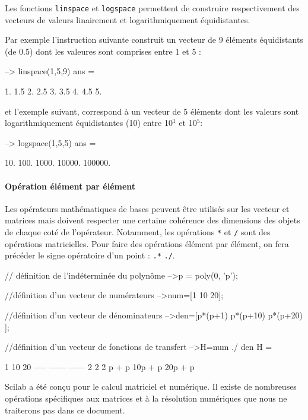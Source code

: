 Les fonctions \verb?linspace? et \verb?logspace? permettent de construire 
respectivement des vecteurs de valeurs linairement et logarithmiquement 
équidistantes.  

Par exemple l'instruction suivante construit un vecteur de 9 éléments 
équidistants (de 0.5) dont les valeures sont comprises entre 1 et 5 :
\begin{Scilabcode}
--> linspace(1,5,9)
 ans  =

    1.   1.5   2.   2.5   3.   3.5   4.   4.5   5.
\end{Scilabcode}
et l'exemple suivant, correspond à un vecteur de 5 éléments dont les 
valeurs sont logarithmiquement équidistantes (10) entre 10$^1$ et 10$^5$:
\begin{Scilabcode}
--> logspace(1,5,5)
 ans  =

    10.   100.   1000.   10000.   100000.

\end{Scilabcode}
\paragraph{Opération élément par élément}
Les opérateurs mathématiques de bases peuvent être utilisés 
sur les vecteur et matrices mais doivent respecter une certaine 
cohérence des dimensions des objets de chaque coté de l'opérateur. 
Notamment, les opérations \verb?*? et \verb?/? sont des opérations 
matricielles. Pour faire des opérations élément par élément,
on fera précéder le signe opératoire d'un point : \verb?.*? \verb?./?.
\begin{Scilabcode}
// définition de l'indéterminée du polynôme
-->p = poly(0, 'p');

//définition d'un vecteur de numérateurs
-->num=[1 10 20];

//définition d'un vecteur de dénominateurs
-->den=[p*(p+1) p*(p+10) p*(p+20) ];

//définition d'un vecteur de fonctions de transfert
-->H=num ./ den
 H  =
 
      1         10          20      
    -----     ------      ------    
         2           2           2  
    p + p     10p + p     20p + p   
\end{Scilabcode}
Scilab a été conçu pour le calcul matriciel et numérique. 
Il existe de nombreuses opérations spécifiques aux matrices et à la 
résolution numériques que nous ne traiterons pas dans ce document.

